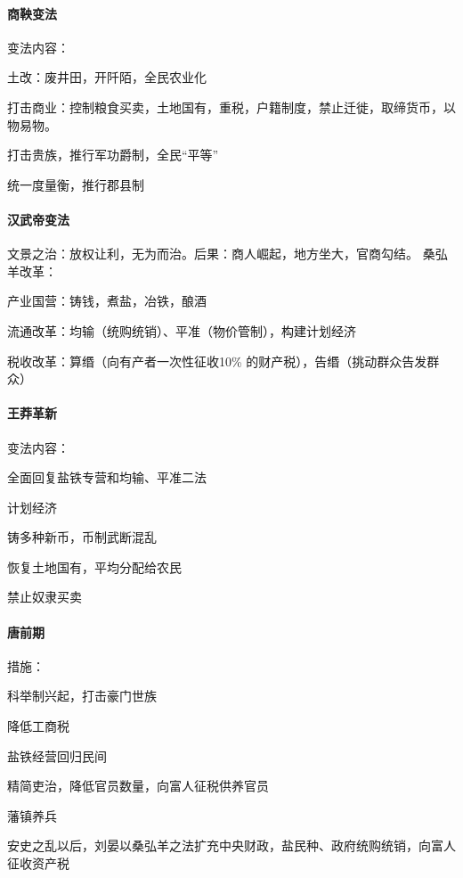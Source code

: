 \paragraph{商鞅变法}

变法内容：
\begin{itemize*}
	\item 土改：废井田，开阡陌，全民农业化
	\item 打击商业：控制粮食买卖，土地国有，重税，户籍制度，禁止迁徙，取缔货币，以物易物。
	\item 打击贵族，推行军功爵制，全民“平等”
	\item 统一度量衡，推行郡县制
\end{itemize*}

\paragraph{汉武帝变法}

文景之治：放权让利，无为而治。后果：商人崛起，地方坐大，官商勾结。 
桑弘羊改革：
\begin{itemize*}
	\item 产业国营：铸钱，煮盐，冶铁，酿酒
	\item 流通改革：均输（统购统销）、平准（物价管制），构建计划经济
	\item 税收改革：算缗（向有产者一次性征收10\% 的财产税），告缗（挑动群众告发群众）
\end{itemize*}

\paragraph{王莽革新}

变法内容：
\begin{itemize*}
	\item 全面回复盐铁专营和均输、平准二法
	\item 计划经济
	\item 铸多种新币，币制武断混乱
	\item 恢复土地国有，平均分配给农民
	\item 禁止奴隶买卖
\end{itemize*}

\paragraph{唐前期}

措施：
\begin{itemize*}
	\item 科举制兴起，打击豪门世族
	\item 降低工商税
	\item 盐铁经营回归民间
	\item 精简吏治，降低官员数量，向富人征税供养官员
	\item 藩镇养兵
\end{itemize*}
安史之乱以后，刘晏以桑弘羊之法扩充中央财政，盐民种、政府统购统销，向富人征收资产税

